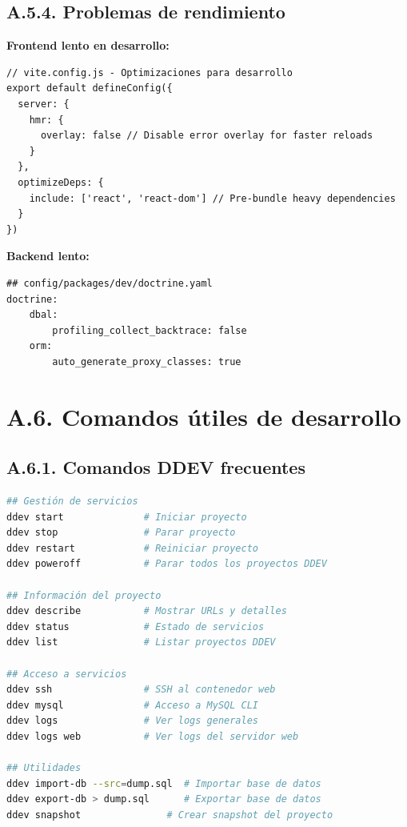 \documentclass[12pt,a4paper,oneside]{report}
\begin{document}
\subsection{A.5.4. Problemas de
rendimiento}\label{a.5.4.-problemas-de-rendimiento}

\textbf{Frontend lento en desarrollo:}

\begin{lstlisting}
// vite.config.js - Optimizaciones para desarrollo
export default defineConfig({
  server: {
    hmr: {
      overlay: false // Disable error overlay for faster reloads
    }
  },
  optimizeDeps: {
    include: ['react', 'react-dom'] // Pre-bundle heavy dependencies
  }
})
\end{lstlisting}

\textbf{Backend lento:}

\begin{lstlisting}
## config/packages/dev/doctrine.yaml
doctrine:
    dbal:
        profiling_collect_backtrace: false
    orm:
        auto_generate_proxy_classes: true
\end{lstlisting}

\section{A.6. Comandos útiles de
desarrollo}\label{a.6.-comandos-uxfatiles-de-desarrollo}

\subsection{A.6.1. Comandos DDEV
frecuentes}\label{a.6.1.-comandos-ddev-frecuentes}

\begin{lstlisting}[language=bash]
## Gestión de servicios
ddev start              # Iniciar proyecto
ddev stop               # Parar proyecto
ddev restart            # Reiniciar proyecto
ddev poweroff           # Parar todos los proyectos DDEV

## Información del proyecto
ddev describe           # Mostrar URLs y detalles
ddev status             # Estado de servicios
ddev list               # Listar proyectos DDEV

## Acceso a servicios
ddev ssh                # SSH al contenedor web
ddev mysql              # Acceso a MySQL CLI
ddev logs               # Ver logs generales
ddev logs web           # Ver logs del servidor web

## Utilidades
ddev import-db --src=dump.sql  # Importar base de datos
ddev export-db > dump.sql      # Exportar base de datos
ddev snapshot               # Crear snapshot del proyecto
\end{lstlisting}
\end{document}
